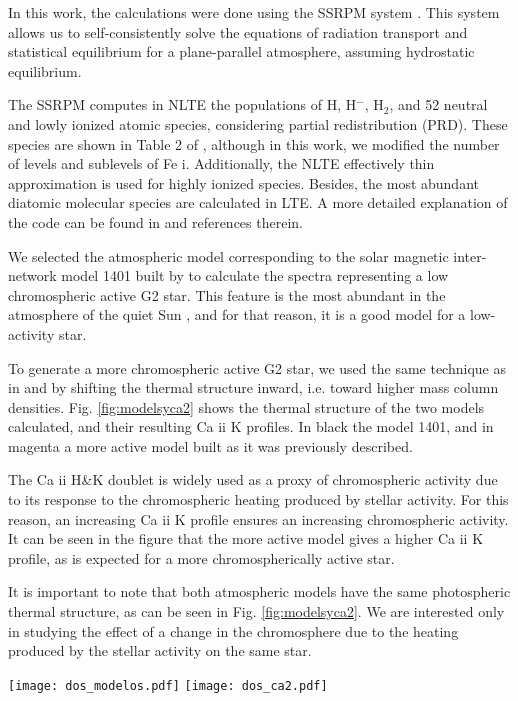 \documentclass[baaa]{baaa}
\begin{document}
In this work, the calculations were done using the {\sc SSRPM} system \citep{fon15}. This system allows us to self-consistently solve the equations of radiation transport and statistical equilibrium for a plane-parallel atmosphere, assuming hydrostatic equilibrium. 

The {\sc SSRPM} computes in NLTE the populations of H, H$^{-}$, H$_{2}$, and 52 neutral and lowly ionized atomic species, considering partial redistribution (PRD). These species are shown in Table 2 of \cite{fon15}, although in this work, we modified the number of levels and sublevels of Fe {\sc i}. Additionally, the NLTE effectively thin approximation is used for highly ionized species. Besides, the most abundant diatomic molecular species are calculated in LTE. A more detailed explanation of the code can be found in \cite{fon16} and references therein. 

We selected the atmospheric model corresponding to the solar magnetic inter-network model 1401 built by \cite{fon15} to calculate the spectra representing a low chromospheric active G2 star. This feature is the most abundant in the atmosphere of the quiet Sun \citep{fon11}, and for that reason, it is a good model for a low-activity star. 

To generate a more chromospheric active G2 star, we used the same technique as in \citet{viey04} and \citet{andre95} by shifting the  thermal structure inward, i.e. toward higher mass column densities. Fig. \ref{fig:modelsyca2} shows the thermal structure of the two models calculated, and their resulting Ca {\sc ii} K profiles. In black the model 1401, and in magenta a more active model built as it was previously described.

The Ca {\sc ii} H\&K doublet is widely used as a proxy of chromospheric activity due to its response to the chromospheric heating produced by stellar activity. For this reason, an increasing Ca {\sc ii} K profile ensures an increasing chromospheric activity.  It can be seen in the figure that the more active model gives a higher Ca {\sc ii} K profile, as is expected for a more chromospherically active star. 

It is important to note that both atmospheric models have the same photospheric thermal structure, as can be seen in Fig. \ref{fig:modelsyca2}. We are interested only in studying the effect of a change in the chromosphere due to the heating produced by the stellar activity on the same star. 

\begin{figure*}[ht]
\centering
\texttt{[image: dos\_modelos.pdf]}%
\texttt{[image: dos\_ca2.pdf]}%
\caption{\textit{Left:} Atmospheric models with different chromospheric level of activity. In black the model for the quiet Sun 1401, and in magenta a more active model built from it. \textit{Right:} Ca {\sc ii} K profiles calculated from each model, plotted with the same line colour as the corresponding model. }
\label{fig:modelsyca2}
\end{figure*}
\end{document}
